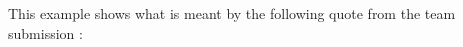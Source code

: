 % 
% 
% 
% 
% 
% 
%
%
%
This example shows what is meant by the following quote from the \wwwc team submission \cite{Notation3}:

